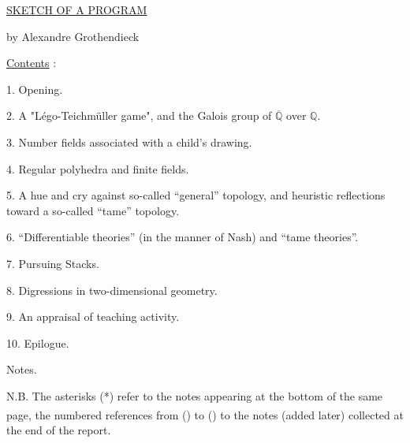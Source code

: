 \uline{SKETCH OF A PROGRAM}

by Alexandre Grothendieck

\uline{Contents} :

1. Opening.

2. A "Légo-Teichmüller game", and the Galois group of $\overline{\mathbb{Q}}$ over $\mathbb{Q}$.

3. Number fields associated with a child's drawing.

4. Regular polyhedra and finite fields.

5. A hue and cry against so-called ``general'' topology, and heuristic reflections
toward a so-called ``tame'' topology.

6. ``Differentiable theories'' (in the manner of Nash) and ``tame theories''.

7. Pursuing Stacks.

8. Digressions in two-dimensional geometry.

9. An appraisal of teaching activity.

10. Epilogue.

Notes.

N.B. The asterisks (*) refer to the notes appearing at the bottom of
the same page, the numbered references from (\textsuperscript{}) to (\textsuperscript{}) to the notes (added
later) collected at the end of the report.


